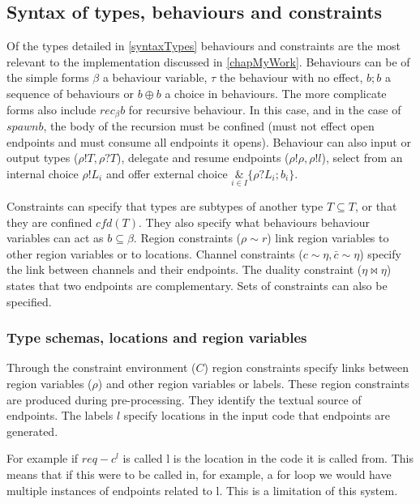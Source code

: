 \subsection{Syntax of types, behaviours and constraints}

Of the types detailed in \ref{syntaxTypes} behaviours and constraints are the most relevant to the implementation discussed in \ref{chapMyWork}. Behaviours can be of the simple forms $\beta$ a behaviour variable, $\tau$ the behaviour with no effect, $b;b$ a sequence of behaviours or $b \oplus b$ a choice in behaviours. The more complicate forms also include $rec_\beta b$ for recursive behaviour. In this case, and in the case of $spawn b$, the body of the recursion must be confined (must not effect open endpoints and must consume all endpoints it opens). Behaviour can also input or output types ($\rho!T, \rho?T$), delegate and resume endpoints ($\rho!\rho, \rho!l$), select from an internal choice $\rho ! L_i$ and offer external choice $\underset{i \in I}{\&}\{\rho?L_i ; b_i\}$.

Constraints can specify that types are subtypes of another type $T\subseteq T$, or that they are confined $cfd(T)$. They also specify what behaviours behaviour variables can act as $b\subseteq \beta$. Region constraints ($\rho \sim r$) link region variables to other region variables or to locations. Channel constraints ($c\sim\eta, \bar{c}\sim\eta$) specify the link between channels and their endpoints. The duality constraint ($\eta \bowtie \eta$) states that two endpoints are complementary. Sets of constraints can also be specified. 


\subsubsection{Type schemas, locations and region variables}

Through the constraint environment ($C$) region constraints specify links between region variables ($\rho$) and other region variables or labels. These region constraints are produced during pre-processing. They identify the textual source of endpoints. The labels $l$ specify locations in the input code that endpoints are generated.

For example if $req-c^l$ is called l is the location in the code it is called from. This means that if this were to be called in, for example, a for loop we would have multiple instances of endpoints related to l. This is a limitation of this system. 

